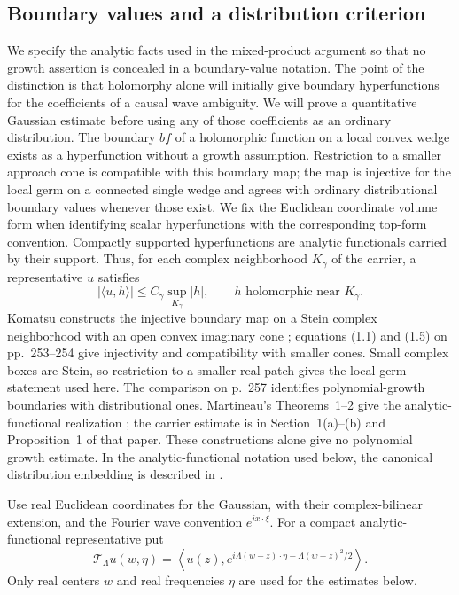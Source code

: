 \subsection{Boundary values and a distribution criterion}

We specify the analytic facts used in the mixed-product argument so
that no growth assertion is concealed in a boundary-value notation.
The point of the distinction is that holomorphy alone will initially
give boundary hyperfunctions for the coefficients of a causal wave
ambiguity.  We will prove a quantitative Gaussian estimate before
using any of those coefficients as an ordinary distribution.
The boundary $b f$ of a holomorphic function on a local convex wedge
exists as a hyperfunction without a growth assumption.  Restriction
to a smaller approach cone is compatible with this boundary map; the
map is injective for the local germ on a connected single wedge and
agrees with ordinary distributional boundary values whenever those
exist.  We fix the Euclidean coordinate volume form when identifying
scalar hyperfunctions with the corresponding top-form convention.  Compactly
supported hyperfunctions are analytic functionals carried by their
support.  Thus, for each complex neighborhood $K_\gamma$ of the
carrier, a representative $u$ satisfies
\begin{equation}\label{R:carrier}
 |\langle u,h\rangle|\leq C_\gamma\sup_{K_\gamma}|h|,
 \qquad h\text{ holomorphic near }K_\gamma.
\end{equation}
Komatsu constructs the injective boundary map on a Stein complex
neighborhood with an open convex imaginary cone
\cite[Section~1]{Komatsu1973}; equations (1.1) and (1.5) on
pp.~253--254 give injectivity and compatibility with smaller cones.
Small complex boxes are Stein, so restriction to a smaller real patch
gives the local germ statement used here.  The comparison on p.~257
identifies polynomial-growth boundaries with distributional ones.
Martineau's Theorems~1--2 give the analytic-functional realization
\cite{Martineau1961}; the carrier estimate is in Section~1(a)--(b)
and Proposition~1 of that paper.  These constructions alone give no
polynomial growth estimate.  In the analytic-functional notation
used below, the canonical distribution embedding is described in
\cite[Section~4, equation~(4.3)]{HoepfnerRagognette2021}.

Use real Euclidean coordinates for the Gaussian, with their
complex-bilinear extension, and the Fourier wave convention
$e^{ix\cdot\xi}$.  For a compact analytic-functional representative put
\begin{equation}\label{R:FBI}
 \mathcal T_\Lambda u(w,\eta)
   =\left\langle u(z),
       e^{i\Lambda(w-z)\cdot\eta-\Lambda(w-z)^2/2}\right\rangle.
\end{equation}
Only real centers $w$ and real frequencies $\eta$ are used for the
estimates below.

